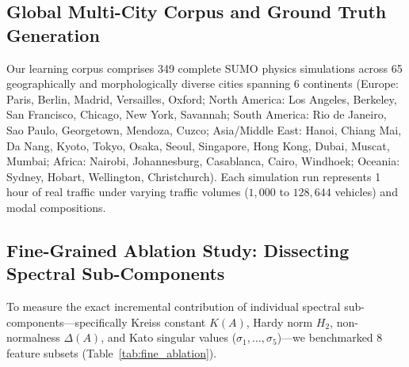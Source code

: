 \documentclass[lettersize,journal]{IEEEtran}
\begin{document}
\subsection{Global Multi-City Corpus and Ground Truth Generation}
Our learning corpus comprises 349 complete SUMO physics simulations across 65 geographically and morphologically diverse cities spanning 6 continents (Europe: Paris, Berlin, Madrid, Versailles, Oxford; North America: Los Angeles, Berkeley, San Francisco, Chicago, New York, Savannah; South America: Rio de Janeiro, Sao Paulo, Georgetown, Mendoza, Cuzco; Asia/Middle East: Hanoi, Chiang Mai, Da Nang, Kyoto, Tokyo, Osaka, Seoul, Singapore, Hong Kong, Dubai, Muscat, Mumbai; Africa: Nairobi, Johannesburg, Casablanca, Cairo, Windhoek; Oceania: Sydney, Hobart, Wellington, Christchurch). Each simulation run represents 1 hour of real traffic under varying traffic volumes ($1,000$ to $128,644$ vehicles) and modal compositions.

\subsection{Fine-Grained Ablation Study: Dissecting Spectral Sub-Components}
To measure the exact incremental contribution of individual spectral sub-components—specifically Kreiss constant $K(A)$, Hardy norm $H_2$, non-normalness $\Delta(A)$, and Kato singular values ($\sigma_1, \dots, \sigma_5$)—we benchmarked 8 feature subsets (Table~\ref{tab:fine_ablation}).
\end{document}

